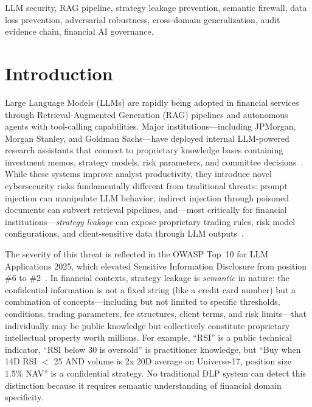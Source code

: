 \documentclass[journal]{IEEEtran}
\begin{document}
\begin{IEEEkeywords}
LLM security, RAG pipeline, strategy leakage prevention, semantic firewall, data loss prevention, adversarial robustness, cross-domain generalization, audit evidence chain, financial AI governance.
\end{IEEEkeywords}

\IEEEpeerreviewmaketitle

\section{Introduction}
\label{Sect:Introduction}

Large Language Models (LLMs) are rapidly being adopted in financial services through Retrieval-Augmented Generation (RAG) pipelines and autonomous agents with tool-calling capabilities. Major institutions---including JPMorgan, Morgan Stanley, and Goldman Sachs---have deployed internal LLM-powered research assistants that connect to proprietary knowledge bases containing investment memos, strategy models, risk parameters, and committee decisions~\cite{wsj_jpmorgan_ai, bloomberg_ms_ai, ft_gs_ai}. While these systems improve analyst productivity, they introduce novel cybersecurity risks fundamentally different from traditional threats: prompt injection can manipulate LLM behavior, indirect injection through poisoned documents can subvert retrieval pipelines, and---most critically for financial institutions---\textit{strategy leakage} can expose proprietary trading rules, risk model configurations, and client-sensitive data through LLM outputs~\cite{owasp_llm_2025}.

The severity of this threat is reflected in the OWASP Top~10 for LLM Applications 2025, which elevated Sensitive Information Disclosure from position \#6 to \#2~\cite{owasp_llm_2025}. In financial contexts, strategy leakage is \textit{semantic} in nature: the confidential information is not a fixed string (like a credit card number) but a combination of concepts---including but not limited to specific thresholds, conditions, trading parameters, fee structures, client terms, and risk limits---that individually may be public knowledge but collectively constitute proprietary intellectual property worth millions. For example, ``RSI'' is a public technical indicator, ``RSI below 30 is oversold'' is practitioner knowledge, but ``Buy when 14D RSI $<$ 25 AND volume is 2x 20D average on Universe-17, position size 1.5\% NAV'' is a confidential strategy. No traditional DLP system can detect this distinction because it requires semantic understanding of financial domain specificity.
\end{document}
